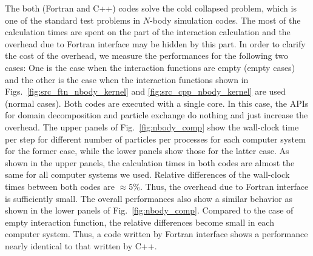 \documentclass[proof,useamsfonts]{pasj01}
\begin{document}
The both (Fortran and C++) codes solve the cold collapsed problem, which is one of the standard test problems in $N$-body simulation codes. The most of the calculation times are spent on the part of the interaction calculation and the overhead due to Fortran interface may be hidden by this part. In order to clarify the cost of the overhead, we measure the performances for the following two cases: One is the case when the interaction functions are empty (empty cases) and the other is the case when the interaction functions shown in Figs.~\ref{fig:src_ftn_nbody_kernel} and \ref{fig:src_cpp_nbody_kernel} are used (normal cases). Both codes are executed with a single core. In this case, the APIs for domain decomposition and particle exchange do nothing and just increase the overhead. The upper panels of Fig.~\ref{fig:nbody_comp} show the wall-clock time per step for different number of particles per processes for each computer system for the former case, while the lower panels show those for the latter case. As shown in the upper panels, the calculation times in both codes are almost the same for all computer systems we used. Relative differences of the wall-clock times between both codes are $\approx 5\%$. Thus, the overhead due to Fortran interface is sufficiently small. The overall performances also show a similar behavior as shown in the lower panels of Fig.~\ref{fig:nbody_comp}. Compared to the case of empty interaction function, the relative differences become small in each computer system. Thus, a code written by Fortran interface shows a performance nearly identical to that written by C++.
\end{document}

